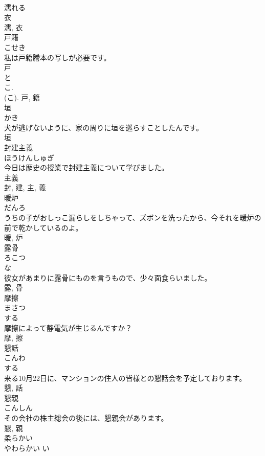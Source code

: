 \documentclass[8pt]{extreport}
\begin{document}
\begin{CJK}{UTF8}{min}
\\	濡れる 
\\	衣 
\\	濡, 衣	
\\	戸籍	
\\	こせき	
\\	私は戸籍謄本の写しが必要です。	
\\	戸 
\\	と 
\\	こ. 
\\	(こ).	戸, 籍	
\\	垣	
\\	かき	
\\	犬が逃げないように、家の周りに垣を巡らすことしたんです。	
\\	垣	
\\	封建主義	
\\	ほうけんしゅぎ	
\\	今日は歴史の授業で封建主義について学びました。	
\\	主義 
\\	封, 建, 主, 義	
\\	暖炉	
\\	だんろ	
\\	うちの子がおしっこ漏らしをしちゃって、ズボンを洗ったから、今それを暖炉の前で乾かしているのよ。	
\\	暖, 炉	
\\	露骨	
\\	ろこつ	
\\	な 
\\	彼女があまりに露骨にものを言うもので、少々面食らいました。	
\\	露, 骨	
\\	摩擦	
\\	まさつ	
\\	する 
\\	摩擦によって静電気が生じるんですか？	
\\	摩, 擦	
\\	懇話	
\\	こんわ	
\\	する 
\\	来る10月22日に、マンションの住人の皆様との懇話会を予定しております。	
\\	懇, 話	
\\	懇親	
\\	こんしん	
\\	その会社の株主総会の後には、懇親会があります。	
\\	懇, 親	
\\	柔らかい	
\\	やわらかい	い 

\end{CJK}
\end{document}
